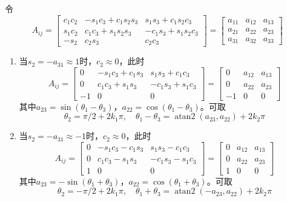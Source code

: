 令
\begin{equation}
A_{ij} =
\begin{bmatrix}
c_1c_2  & -s_1c_3 + c_1s_2s_3  & s_1s_3 + c_1s_2c_3 \\
s_1c_2  & c_1c_3 + s_1s_2s_3   & -c_1s_3 + s_1s_2c_3 \\
-s_2    & c_2s_3               & c_2c_3
\end{bmatrix}
=
\begin{bmatrix}
a_{11} & a_{12} & a_{13} \\ a_{21} & a_{22} & a_{23} \\ a_{31} & a_{32} & a_{33}
\end{bmatrix}
\end{equation}

\begin{enumerate}
\item[(I)] 当$s_2 = -a_{31} \approx 1$时，$c_2 \approx 0$，此时
\begin{equation}
A_{ij} =
\begin{bmatrix}
0 & -s_1c_3 + c_1s_3 & s_1s_3 + c_1c_3 \\[3pt]
0 & c_1c_3 + s_1s_3  & -c_1s_3 + s_1c_3 \\[3pt]
-1 & 0               & 0
\end{bmatrix}
=
\begin{bmatrix}
0 & a_{12} & a_{13} \\ 0 & a_{22} & a_{23} \\ -1 & 0 & 0
\end{bmatrix}
\end{equation}
其中$a_{23} = \sin(\theta_1 - \theta_3)$，$a_{22} = \cos(\theta_1 - \theta_3)$。可取
\begin{equation}
\theta_2 = \pi/2 + 2k_1\pi, \quad
\theta_1 - \theta_3 = \operatorname{atan2}(a_{23}, a_{22}) + 2k_2\pi
\end{equation}

\item[(II)] 当$s_2 = -a_{31} \approx -1$时，$c_2 \approx 0$，此时
\begin{equation}
A_{ij} =
\begin{bmatrix}
0 & -s_1c_3 - c_1s_3 & s_1s_3 - c_1c_3 \\[3pt]
0 & c_1c_3 - s_1s_3  & -c_1s_3 - s_1c_3 \\[3pt]
1 & 0                & 0
\end{bmatrix}
=
\begin{bmatrix}
0 & a_{12} & a_{13} \\ 0 & a_{22} & a_{23} \\ 1 & 0 & 0
\end{bmatrix}
\end{equation}
其中$a_{23} = -\sin(\theta_1 + \theta_3)$，$a_{22} = \cos(\theta_1 + \theta_3)$。可取
\begin{equation}
\theta_2 = -\pi/2 + 2k_1\pi, \quad
\theta_1 + \theta_3 = \operatorname{atan2}(-a_{23}, a_{22}) + 2k_2\pi
\end{equation}


\end{enumerate}
